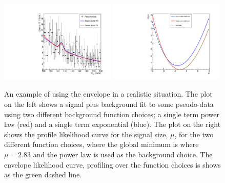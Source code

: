 \begin{figure}
  \begin{center}
    \includegraphics[width=0.49\textwidth]{ch5_anal_and_results/plots/envelope_explain2.pdf}
    \includegraphics[width=0.49\textwidth]{ch5_anal_and_results/plots/envelope_explain3.pdf}
    \caption{An example of using the envelope in a realistic situation. The plot on the left shows a signal plus background fit to some pseudo-data using two different background function choices; a single term power law (red) and a single term exponential (blue). The plot on the right shows the profile likelihood curve for the signal size, $\mu$, for the two different function choices, where the global minimum is where $\mu=2.83$ and the power law is used as the background choice. The envelope likelihood curve, profiling over the function choices is shows as the green dashed line.}
    \label{fig:envelope_explain2}
  \end{center}
\end{figure}


